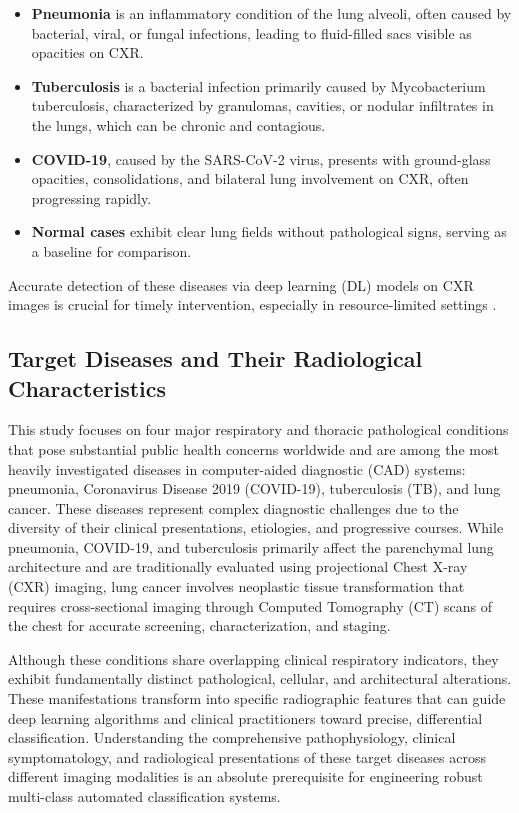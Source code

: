\begin{itemize} \itemsep 10pt
	\item \textbf{Pneumonia} is an inflammatory condition of the lung alveoli, often caused by bacterial, viral, or fungal infections, leading to fluid-filled sacs visible as opacities on CXR.
	\item \textbf{Tuberculosis} is a bacterial infection primarily caused by Mycobacterium tuberculosis, characterized by granulomas, cavities, or nodular infiltrates in the lungs, which can be chronic and contagious.
	\item \textbf{COVID-19}, caused by the SARS-CoV-2 virus, presents with ground-glass opacities, consolidations, and bilateral lung involvement on CXR, often progressing rapidly.
	\item \textbf{Normal cases} exhibit clear lung fields without pathological signs, serving as a baseline for comparison.
\end{itemize}
Accurate detection of these diseases via deep learning (DL) models on CXR images is crucial for timely intervention, especially in resource-limited settings \cite{ref8} \cite{ref9}.

\subsection{Target Diseases and Their Radiological Characteristics}
\label{subsec:target_diseases}

This study focuses on four major respiratory and thoracic pathological conditions that pose substantial public health concerns worldwide and are among the most heavily investigated diseases in computer-aided diagnostic (CAD) systems: pneumonia, Coronavirus Disease 2019 (COVID-19), tuberculosis (TB), and lung cancer. These diseases represent complex diagnostic challenges due to the diversity of their clinical presentations, etiologies, and progressive courses. While pneumonia, COVID-19, and tuberculosis primarily affect the parenchymal lung architecture and are traditionally evaluated using projectional Chest X-ray (CXR) imaging, lung cancer involves neoplastic tissue transformation that requires cross-sectional imaging through Computed Tomography (CT) scans of the chest for accurate screening, characterization, and staging. 

Although these conditions share overlapping clinical respiratory indicators, they exhibit fundamentally distinct pathological, cellular, and architectural alterations. These manifestations transform into specific radiographic features that can guide deep learning algorithms and clinical practitioners toward precise, differential classification. Understanding the comprehensive pathophysiology, clinical symptomatology, and radiological presentations of these target diseases across different imaging modalities is an absolute prerequisite for engineering robust multi-class automated classification systems.


